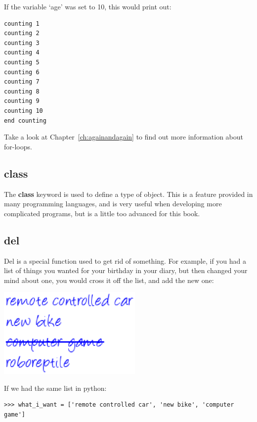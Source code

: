 \noindent
If the variable `age' was set to 10, this would print out:

\begin{listing}
\begin{verbatim}
counting 1
counting 2
counting 3
counting 4
counting 5
counting 6
counting 7
counting 8
counting 9
counting 10
end counting
\end{verbatim}
\end{listing}

\noindent
Take a look at Chapter~\ref{ch:againandagain} to find out more information about for-loops.

\subsection*{class}

The \textbf{class} keyword is used to define a type of object. This is a feature provided in many programming languages, and is very useful when developing more complicated programs, but is a little too advanced for this book.

\subsection*{del}

Del is a special function used to get rid of something. For example, if you had a list of things you wanted for your birthday in your diary, but then changed your mind about one, you would cross it off the list, and add the new one:

\begin{center}
\includegraphics*[width=70mm]{list.eps}
\end{center}

\noindent
If we had the same list in python:

\begin{listing}
\begin{verbatim}
>>> what_i_want = ['remote controlled car', 'new bike', 'computer game']
\end{verbatim}
\end{listing}

